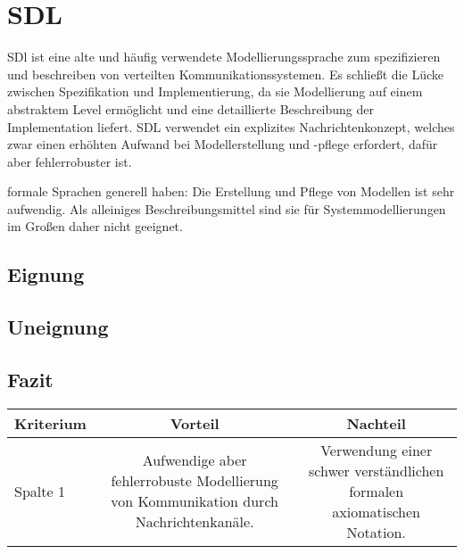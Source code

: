 \section{SDL}
\label{sc:SDLB}
\ac{SDl} ist eine alte und häufig verwendete Modellierungssprache zum spezifizieren und beschreiben von verteilten Kommunikationssystemen. 
Es schließt die Lücke zwischen Spezifikation und Implementierung, da sie Modellierung auf einem abstraktem Level ermöglicht und eine detaillierte Beschreibung der Implementation liefert. \ac{SDL} verwendet ein  explizites  Nachrichtenkonzept,  welches  zwar  einen  erhöhten  Aufwand  bei  Modellerstellung und -pflege erfordert, dafür aber fehlerrobuster ist. 


formale Sprachen generell haben: Die Erstellung und Pflege von Modellen ist sehr aufwendig. Als alleiniges Beschreibungsmittel sind sie für Systemmodellierungen im Großen daher nicht geeignet.
\subsection{Eignung}

\subsection{Uneignung}

\subsection{Fazit}

\begin{tabular}{|l|c|c|}
	\hline
	Kriterium & Vorteil & Nachteil  \\
	\hline
	Spalte 1 & Aufwendige aber fehlerrobuste Modellierung von Kommunikation durch Nachrichtenkanäle. & Verwendung einer schwer verständlichen formalen axiomatischen Notation. \\
	\hline
	\hline
\end{tabular}